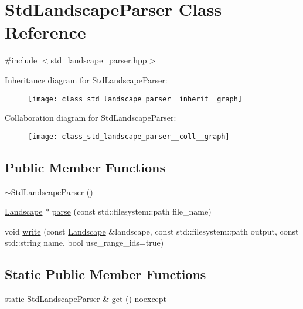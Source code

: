 \hypertarget{class_std_landscape_parser}{}\section{Std\+Landscape\+Parser Class Reference}
\label{class_std_landscape_parser}


{\ttfamily \#include $<$std\+\_\+landscape\+\_\+parser.\+hpp$>$}



Inheritance diagram for Std\+Landscape\+Parser\+:\nopagebreak
\begin{figure}[H]
\begin{center}
\leavevmode
\texttt{[image: class\_std\_landscape\_parser\_\_inherit\_\_graph]}
\end{center}
\end{figure}


Collaboration diagram for Std\+Landscape\+Parser\+:\nopagebreak
\begin{figure}[H]
\begin{center}
\leavevmode
\texttt{[image: class\_std\_landscape\_parser\_\_coll\_\_graph]}
\end{center}
\end{figure}
\subsection*{Public Member Functions}
\begin{DoxyCompactItemize}
\item 
\hyperlink{class_std_landscape_parser_a458a4a8dd2cacfe0e708f8632dbbf2ff}{$\sim$\+Std\+Landscape\+Parser} ()
\item 
\hyperlink{class_landscape}{Landscape} $\ast$ \hyperlink{class_std_landscape_parser_a73c807c756f6f6a90d23d95d91a4e700}{parse} (const std\+::filesystem\+::path file\+\_\+name)
\item 
void \hyperlink{class_std_landscape_parser_aa899b09850676bac3abdc04d25882e86}{write} (const \hyperlink{class_landscape}{Landscape} \&landscape, const std\+::filesystem\+::path output, const std\+::string name, bool use\+\_\+range\+\_\+ids=true)
\end{DoxyCompactItemize}
\subsection*{Static Public Member Functions}
\begin{DoxyCompactItemize}
\item 
static \hyperlink{class_std_landscape_parser}{Std\+Landscape\+Parser} \& \hyperlink{class_std_landscape_parser_a849d9a5edb03a7748e19dbcef83b9c1c}{get} () noexcept
\end{DoxyCompactItemize}
